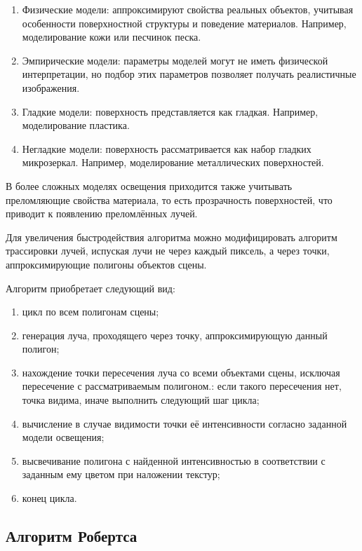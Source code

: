 \begin{enumerate}
\begin{enumerate}
	\item Физические модели: аппроксимируют свойства реальных объектов, учитывая особенности поверхностной структуры и поведение материалов. Например, моделирование кожи или песчинок песка. 

	\item Эмпирические модели: параметры моделей могут не иметь физической интерпретации, но подбор этих параметров позволяет получать реалистичные изображения.

	\item Гладкие модели: поверхность представляется как гладкая. Например, моделирование пластика.

	\item Негладкие модели: поверхность рассматривается как набор гладких микрозеркал. Например, моделирование металлических поверхностей.

\end{enumerate}

В более сложных моделях освещения приходится также учитывать преломляющие свойства материала, то есть прозрачность поверхностей, что приводит к появлению преломлённых лучей.

Для увеличения быстродействия алгоритма можно модифицировать алгоритм трассировки лучей, испуская лучи не через каждый пиксель, а через точки, аппроксимирующие полигоны объектов сцены.

Алгоритм приобретает следующий вид:
\begin{enumerate}
	\item цикл по всем полигонам сцены;
	\item генерация луча, проходящего через точку, аппроксимирующую данный полигон;
	\item нахождение точки пересечения луча со всеми объектами сцены, исключая пересечение с рассматриваемым полигоном.: если такого пересечения нет, точка видима, иначе выполнить следующий шаг цикла;
	\item вычисление в случае видимости точки её интенсивности согласно заданной модели освещения;
	\item высвечивание полигона с найденной интенсивностью в соответствии с заданным ему цветом при наложении текстур;
	\item конец цикла.
\end{enumerate}

\subsection{Алгоритм Робертса}


\end{enumerate}
